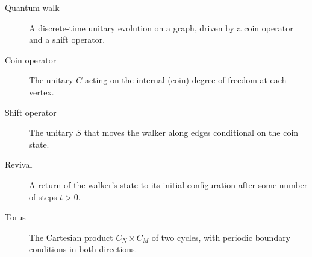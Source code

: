 \begin{description}
  \item[Quantum walk] A discrete-time unitary evolution on a graph, driven
    by a coin operator and a shift operator.
  \item[Coin operator] The unitary $C$ acting on the internal (coin) degree
    of freedom at each vertex.
  \item[Shift operator] The unitary $S$ that moves the walker along edges
    conditional on the coin state.
  \item[Revival] A return of the walker's state to its initial configuration
    after some number of steps $t > 0$.
  \item[Torus] The Cartesian product $C_N \times C_M$ of two cycles, with
    periodic boundary conditions in both directions.
\end{description}

